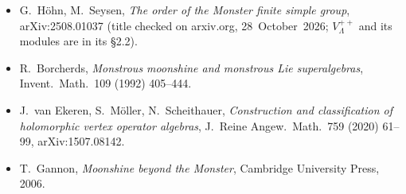 \begin{itemize}
  Contemp.\ Math.\ 193 (1996), arXiv:hep-th/9406190; \emph{Twist vertex operators for twisted
  modules}, arXiv:1902.09734.
\item G.~H\"ohn, M.~Seysen, \emph{The order of the Monster finite simple group}, arXiv:2508.01037 (title checked on
  arxiv.org, 28~October~2026; $V_\Lambda^{++}$ and its modules are in its \S2.2).
\item R.~Borcherds, \emph{Monstrous moonshine and monstrous Lie superalgebras}, Invent.\ Math.\ 109
  (1992) 405--444.
\item J.~van Ekeren, S.~M\"oller, N.~Scheithauer, \emph{Construction and classification of
  holomorphic vertex operator algebras}, J.\ Reine Angew.\ Math.\ 759 (2020) 61--99, arXiv:1507.08142.
\item T.~Gannon, \emph{Moonshine beyond the Monster}, Cambridge University Press, 2006.
\end{itemize}
